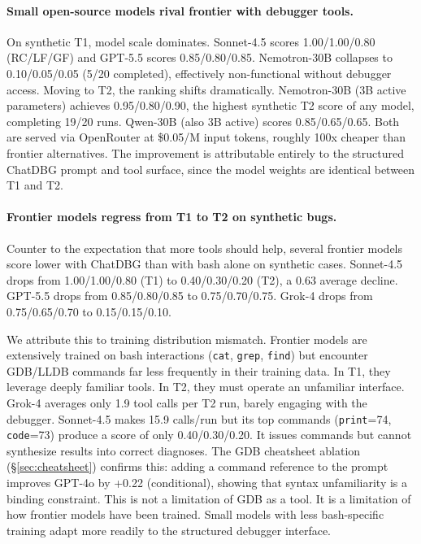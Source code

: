 \documentclass[11pt]{article}
\begin{document}
\paragraph{Small open-source models rival frontier with debugger tools.}
On synthetic T1, model scale dominates. Sonnet-4.5 scores 1.00/1.00/0.80 (RC/LF/GF) and GPT-5.5 scores 0.85/0.80/0.85. Nemotron-30B collapses to 0.10/0.05/0.05 (5/20 completed), effectively non-functional without debugger access. Moving to T2, the ranking shifts dramatically. Nemotron-30B (3B active parameters) achieves 0.95/0.80/0.90, the highest synthetic T2 score of any model, completing 19/20 runs. Qwen-30B (also 3B active) scores 0.85/0.65/0.65. Both are served via OpenRouter at \$0.05/M input tokens, roughly 100x cheaper than frontier alternatives. The improvement is attributable entirely to the structured ChatDBG prompt and tool surface, since the model weights are identical between T1 and T2.

\paragraph{Frontier models regress from T1 to T2 on synthetic bugs.}
Counter to the expectation that more tools should help, several frontier models score lower with ChatDBG than with bash alone on synthetic cases. Sonnet-4.5 drops from 1.00/1.00/0.80 (T1) to 0.40/0.30/0.20 (T2), a 0.63 average decline. GPT-5.5 drops from 0.85/0.80/0.85 to 0.75/0.70/0.75. Grok-4 drops from 0.75/0.65/0.70 to 0.15/0.15/0.10.

We attribute this to training distribution mismatch. Frontier models are extensively trained on bash interactions (\texttt{cat}, \texttt{grep}, \texttt{find}) but encounter GDB/LLDB commands far less frequently in their training data. In T1, they leverage deeply familiar tools. In T2, they must operate an unfamiliar interface. Grok-4 averages only 1.9 tool calls per T2 run, barely engaging with the debugger. Sonnet-4.5 makes 15.9 calls/run but its top commands (\texttt{print}=74, \texttt{code}=73) produce a score of only 0.40/0.30/0.20. It issues commands but cannot synthesize results into correct diagnoses. The GDB cheatsheet ablation (\S\ref{sec:cheatsheet}) confirms this: adding a command reference to the prompt improves GPT-4o by +0.22 (conditional), showing that syntax unfamiliarity is a binding constraint. This is not a limitation of GDB as a tool. It is a limitation of how frontier models have been trained. Small models with less bash-specific training adapt more readily to the structured debugger interface.
\end{document}
